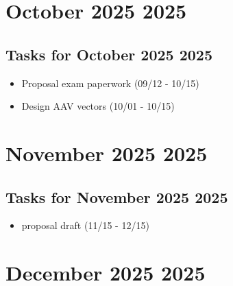\documentclass[landscape,a4paper]{article}
\begin{document}
\section*{October 2025 2025}

\begin{center}
\begin{tikzpicture}[scale=0.9]
\end{tikzpicture}
\end{center}

\vspace{1cm}

\subsection*{Tasks for October 2025 2025}
\begin{itemize}
\item Proposal exam paperwork (09/12 - 10/15)
\item Design AAV vectors (10/01 - 10/15)
\end{itemize}
\newpage

\section*{November 2025 2025}

\begin{center}
\begin{tikzpicture}[scale=0.9]
\end{tikzpicture}
\end{center}

\vspace{1cm}

\subsection*{Tasks for November 2025 2025}
\begin{itemize}
\item proposal draft (11/15 - 12/15)
\end{itemize}
\newpage

\section*{December 2025 2025}
\end{document}
